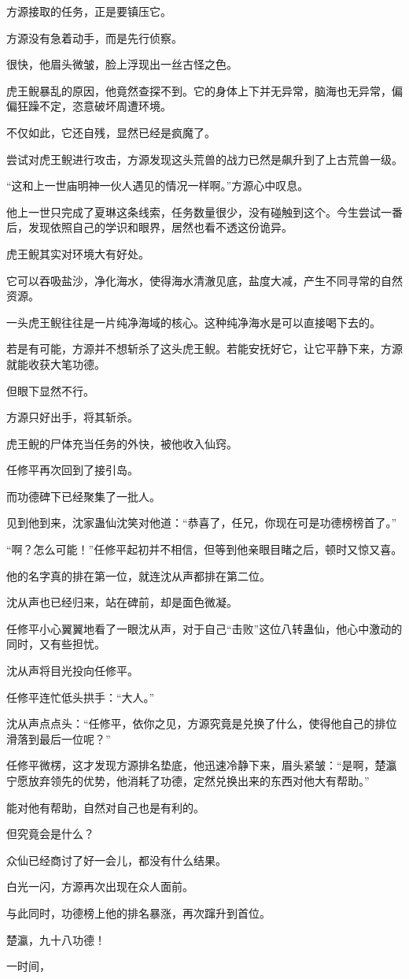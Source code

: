 \begin{this_body}
方源接取的任务，正是要镇压它。

方源没有急着动手，而是先行侦察。

很快，他眉头微皱，脸上浮现出一丝古怪之色。

虎王鲵暴乱的原因，他竟然查探不到。它的身体上下并无异常，脑海也无异常，偏偏狂躁不定，恣意破坏周遭环境。

不仅如此，它还自残，显然已经是疯魔了。

尝试对虎王鲵进行攻击，方源发现这头荒兽的战力已然是飙升到了上古荒兽一级。

“这和上一世庙明神一伙人遇见的情况一样啊。”方源心中叹息。

他上一世只完成了夏琳这条线索，任务数量很少，没有碰触到这个。今生尝试一番后，发现依照自己的学识和眼界，居然也看不透这份诡异。

虎王鲵其实对环境大有好处。

它可以吞吸盐沙，净化海水，使得海水清澈见底，盐度大减，产生不同寻常的自然资源。

一头虎王鲵往往是一片纯净海域的核心。这种纯净海水是可以直接喝下去的。

若是有可能，方源并不想斩杀了这头虎王鲵。若能安抚好它，让它平静下来，方源就能收获大笔功德。

但眼下显然不行。

方源只好出手，将其斩杀。

虎王鲵的尸体充当任务的外快，被他收入仙窍。

任修平再次回到了接引岛。

而功德碑下已经聚集了一批人。

见到他到来，沈家蛊仙沈笑对他道：“恭喜了，任兄，你现在可是功德榜榜首了。”

“啊？怎么可能！”任修平起初并不相信，但等到他亲眼目睹之后，顿时又惊又喜。

他的名字真的排在第一位，就连沈从声都排在第二位。

沈从声也已经归来，站在碑前，却是面色微凝。

任修平小心翼翼地看了一眼沈从声，对于自己“击败”这位八转蛊仙，他心中激动的同时，又有些担忧。

沈从声将目光投向任修平。

任修平连忙低头拱手：“大人。”

沈从声点点头：“任修平，依你之见，方源究竟是兑换了什么，使得他自己的排位滑落到最后一位呢？”

任修平微楞，这才发现方源排名垫底，他迅速冷静下来，眉头紧皱：“是啊，楚瀛宁愿放弃领先的优势，他消耗了功德，定然兑换出来的东西对他大有帮助。”

能对他有帮助，自然对自己也是有利的。

但究竟会是什么？

众仙已经商讨了好一会儿，都没有什么结果。

白光一闪，方源再次出现在众人面前。

与此同时，功德榜上他的排名暴涨，再次蹿升到首位。

楚瀛，九十八功德！

一时间，

\end{this_body}


